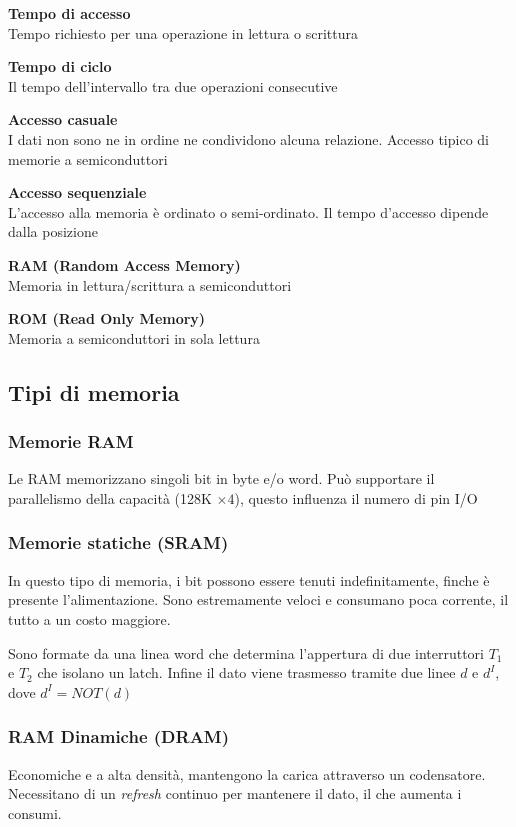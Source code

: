 \documentclass[12pt, a4paper]{article}
\begin{document}
\textbf{Tempo di accesso}\\Tempo richiesto per una operazione in lettura o scrittura

\textbf{Tempo di ciclo}\\Il tempo dell'intervallo tra due operazioni consecutive

\textbf{Accesso casuale}\\I dati non sono ne in ordine ne condividono alcuna relazione. Accesso tipico di memorie a
semiconduttori

\textbf{Accesso sequenziale}\\L'accesso alla memoria è ordinato o semi-ordinato. Il tempo d'accesso dipende dalla
posizione

\textbf{RAM (Random Access Memory)}\\Memoria in lettura/scrittura a semiconduttori

\textbf{ROM (Read Only Memory)}\\Memoria a semiconduttori in sola lettura

\subsection{Tipi di memoria}
\subsubsection{Memorie RAM}
Le RAM memorizzano singoli bit in byte e/o word. Può supportare il parallelismo della capacità (128K $\times4$),
questo influenza il numero di pin I/O

\subsubsection{Memorie statiche (SRAM)}
In questo tipo di memoria, i bit possono essere tenuti indefinitamente, finche è presente l'alimentazione. Sono 
estremamente veloci e consumano poca corrente, il tutto a un costo maggiore.

Sono formate da una linea word che determina l'appertura di due interruttori $T_{1}$ e $T_{2}$ che isolano 
un latch. Infine il dato viene trasmesso tramite due linee $d$ e $d^{I}$, dove $d^{I}=NOT(d)$

\subsubsection{RAM Dinamiche (DRAM)}
Economiche e a alta densità, mantengono la carica attraverso un codensatore. Necessitano di un \textit{refresh}
continuo per mantenere il dato, il che aumenta i consumi.
\end{document}
